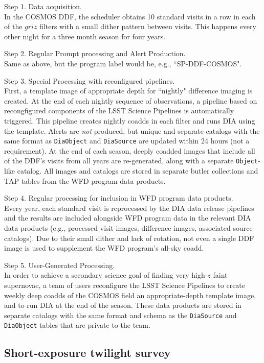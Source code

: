 Step 1. Data acquisition. \\
In the COSMOS DDF, the scheduler obtains 10 standard visits in a row in each of the $griz$ filters
with a small dither pattern between visits.
This happens every other night for a three month season for four years.

Step 2. Regular Prompt processing and Alert Production. \\
Same as above, but the program label would be, e.g., ``SP-DDF-COSMOS".

Step 3. Special Processing with reconfigured pipelines. \\
First, a template image of appropriate depth for ``nightly" difference imaging is created.
At the end of each nightly sequence of observations, a pipeline based on recongfigured 
components of the LSST Science Pipelines is automatically triggered.
This pipeline creates nightly coadds in each filter and runs DIA using the template.
Alerts are \emph{not} produced, but unique and separate catalogs with the same format
as {\tt DiaObject} and {\tt DiaSource} are updated within 24 hours (not a requirement).
At the end of each season, deeply coadded images that include all of the DDF's visits 
from all years are re-generated, along with a separate {\tt Object}-like catalog.
All images and catalogs are stored in separate butler collections and TAP tables from
the WFD program data products.

Step 4. Regular processing for inclusion in WFD program data products. \\
Every year, each standard visit is reprocessed by the DIA data release pipelines
and the results are included alongside WFD program data in the relevant DIA data products
(e.g., processed visit images, difference images, associated source catalogs).
Due to their small dither and lack of rotation, not even a single DDF image 
is used to supplement the WFD program's all-sky coadd.

Step 5. User-Generated Processing. \\
In order to achieve a secondary science goal of finding very high-$z$ faint supernovae,
a team of users reconfigure the LSST Science Pipelines to create weekly deep coadds
of the COSMOS field an appropriate-depth template image, and to run DIA at the
end of the season.
These data products are stored in separate catalogs with the same format and schema as
the {\tt DiaSource} and {\tt DiaObject} tables that are private to the team.


\subsection{Short-exposure twilight survey}\label{ssec:SPCS_Twilight}


